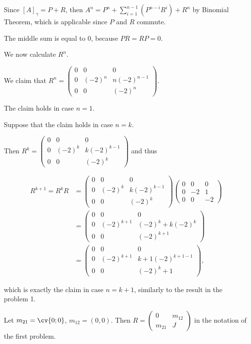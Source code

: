 \documentclass[11pt]{scrartcl}
\begin{document}
\begin{soln}
Since $[A]_{\gamma} = P+R$, then $A^n = P^n +  \sum_{i=1}^{n-1}(P^{n-i}R^{i}) + R^{n}$ by Binomial Theorem, which is applicable since $P$ and $R$ commute.

The middle sum is equal to $0$, because $PR = RP = 0$. 

We now calculate $R^n$.

We claim that  $R^n = 
\begin{pmatrix}
0 & 0 & 0\\
0 & (-2)^{n} & n(-2)^{n-1}\\
0 & 0 &(-2)^n
\end{pmatrix}$.

The claim holds in case $n = 1$.

Suppose that the claim holds in case $n = k$.

Then $R^k = 
\begin{pmatrix}
0 & 0 & 0\\
0 & (-2)^{k} & k(-2)^{k-1}\\
0 & 0 &(-2)^k
\end{pmatrix}$ and thus

\begin{align}
R^{k+1} = R^kR &= 
\begin{pmatrix}
0 & 0 & 0\\
0 & (-2)^{k} & k(-2)^{k-1}\\
0 & 0 &(-2)^k
\end{pmatrix}
  \begin{pmatrix}
0 & 0 & 0\\
0 & -2 & 1\\
0 & 0 & -2
\end{pmatrix}\\
& = 
  \begin{pmatrix}
0 & 0 & 0\\
0 & (-2)^{k+1} & (-2)^k+k(-2)^{k}\\
0 & 0 & (-2)^{k+1}
  \end{pmatrix}\\
&=
  \begin{pmatrix}
0 & 0 & 0\\
0 & (-2)^{k+1} & k+1(-2)^{k+1 - 1}\\
0 & 0 &(-2)^k+1
  \end{pmatrix},
\end{align}

which is exactly the claim in case $n = k+1$, similarly to the result in the problem 1.

Let $m_{21} = \cv{0;0}$, $m_{12}= (0,0)$. Then $R = \begin{pmatrix}
0 & m_{12}\\
m_{21} & J
\end{pmatrix}$ in the notation of the first problem.


\end{soln}
\end{document}
